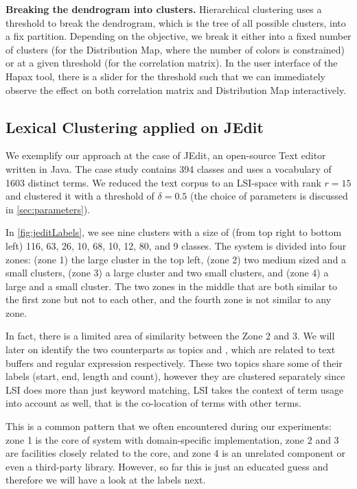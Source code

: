   \textbf{Breaking the dendrogram into clusters.} Hierarchical clustering uses a threshold to break the dendrogram, which is the tree of all possible clusters, into a fix partition. Depending on the objective, we break it either into a fixed number of clusters (\eg for the Distribution Map, where the number of colors is constrained) or at a given threshold (\eg for the correlation matrix). In the user interface of the Hapax tool, there is a slider for the threshold such that we can immediately observe the effect on both correlation matrix and Distribution Map interactively.

\subsection{Lexical Clustering applied on JEdit}

We exemplify our approach at the case of JEdit, an open-source Text editor written in Java. The case study contains 394 classes and uses a vocabulary of 1603 distinct terms. We reduced the text corpus to an LSI-space with rank $r = 15$ and clustered it with a threshold of $\delta = 0.5$ (the choice of parameters is discussed in \autoref{sec:parameters}).

In \autoref{fig:jeditLabels}, we see nine clusters with a size of (from top right to bottom left) 116, 63, 26, 10, 68, 10, 12, 80, and 9 classes. The system is divided into four zones: (zone 1) the large cluster in the top left, (zone 2) two medium sized and a small clusters, (zone 3) a large cluster and two small clusters, and (zone 4) a large and a small cluster. The two zones in the middle that are both similar to the first zone but not to each other, and the fourth zone is not similar to any zone.

In fact, there is a limited area of similarity between the Zone 2 and 3. We will later on identify the two counterparts as topics \pink and \cyan, which are related to text buffers and regular expression respectively. These two topics share some of their labels (\ie start, end, length and count), however they are clustered separately since LSI does more than just keyword matching, LSI takes the context of term usage into account as well, that is the co-location of terms with other terms.

This is a common pattern that we often encountered during our experiments: zone 1 is the core of system with domain-specific implementation, zone 2 and 3 are facilities closely related to the core, and zone 4 is an unrelated component or even a third-party library. However, so far this is just an educated guess and therefore we will have a look at the labels next.

